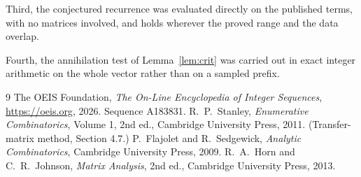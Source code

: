 \documentclass[11pt,a4paper]{article}
\theoremstyle{plain}
\theoremstyle{definition}
\begin{document}
Third, the conjectured recurrence was evaluated directly on the published terms, with no
matrices involved, and holds wherever the proved range and the data overlap.

Fourth, the annihilation test of Lemma~\ref{lem:crit} was carried out in exact integer
arithmetic on the whole vector rather than on a sampled prefix.

\begin{thebibliography}{9}
 The OEIS Foundation, \emph{The On-Line Encyclopedia of Integer
Sequences}, \url{https://oeis.org}, 2026. Sequence A183831.
 R.~P.~Stanley, \emph{Enumerative Combinatorics}, Volume 1, 2nd ed.,
Cambridge University Press, 2011. (Transfer-matrix method, Section 4.7.)
 P.~Flajolet and R.~Sedgewick, \emph{Analytic Combinatorics}, Cambridge
University Press, 2009.
 R.~A.~Horn and C.~R.~Johnson, \emph{Matrix Analysis}, 2nd ed., Cambridge
University Press, 2013.
\end{thebibliography}
\end{document}
